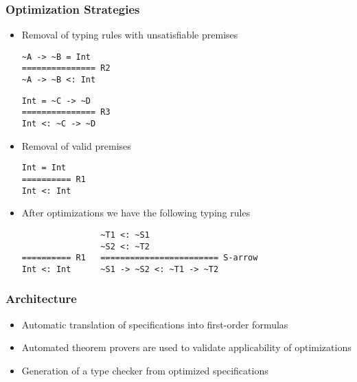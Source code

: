 \documentclass{beamer}
\begin{document}
\begin{frame}[fragile]
\frametitle{Optimization Strategies}
\begin{itemize}
\item<1-> Removal of typing rules with unsatisfiable premises
\begin{multicols}{2}
\begin{lstlisting}
~A -> ~B = Int
=============== R2
~A -> ~B <: Int
\end{lstlisting}
\begin{lstlisting}
Int = ~C -> ~D
=============== R3
Int <: ~C -> ~D
\end{lstlisting}
\end{multicols}
\item<2-> Removal of valid premises
\begin{lstlisting}
Int = Int
========== R1
Int <: Int
\end{lstlisting}
\item<3-> After optimizations we have the following typing rules
\begin{lstlisting}
                ~T1 <: ~S1 
                ~S2 <: ~T2    
========== R1   ======================== S-arrow 
Int <: Int      ~S1 -> ~S2 <: ~T1 -> ~T2
\end{lstlisting}
\end{itemize}
\end{frame}

\begin{frame}
  \frametitle{Architecture}
  \begin{itemize}
  \item Automatic translation of specifications into first-order formulas
  \item Automated theorem provers are used to validate applicability
    of optimizations
  \item Generation of a type checker from optimized specifications
  \end{itemize}
  \vspace{.8cm}
\end{frame}
\end{document}
